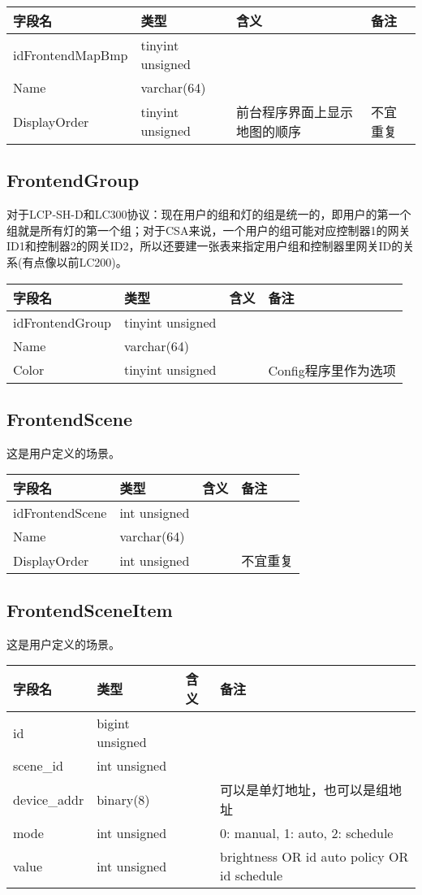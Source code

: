 \begin{longtabu}[c]{@{}lXXX@{}}
\toprule
字段名 & 类型 & 含义 & 备注\tabularnewline
\midrule
\endhead
idFrontendMapBmp & tinyint unsigned & &\tabularnewline
Name & varchar(64) & &\tabularnewline
DisplayOrder & tinyint unsigned & 前台程序界面上显示地图的顺序 &
不宜重复\tabularnewline
\bottomrule
\end{longtabu}

\subsection{FrontendGroup}\label{frontendgroup}

对于LCP-SH-D和LC300协议：现在用户的组和灯的组是统一的，即用户的第一个组就是所有灯的第一个组；对于CSA来说，一个用户的组可能对应控制器1的网关ID1和控制器2的网关ID2，所以还要建一张表来指定用户组和控制器里网关ID的关系(有点像以前LC200)。

\begin{longtabu}[c]{@{}lXXX@{}}
\toprule
字段名 & 类型 & 含义 & 备注\tabularnewline
\midrule
\endhead
idFrontendGroup & tinyint unsigned & &\tabularnewline
Name & varchar(64) & &\tabularnewline
Color & tinyint unsigned & & Config程序里作为选项\tabularnewline
\bottomrule
\end{longtabu}

\subsection{FrontendScene}\label{frontendscene}

这是用户定义的场景。

\begin{longtabu}[c]{@{}lXXX@{}}
\toprule
字段名 & 类型 & 含义 & 备注\tabularnewline
\midrule
\endhead
idFrontendScene & int unsigned & &\tabularnewline
Name & varchar(64) & &\tabularnewline
DisplayOrder & int unsigned & & 不宜重复\tabularnewline
\bottomrule
\end{longtabu}

\subsection{FrontendSceneItem}\label{frontendsceneitem}

这是用户定义的场景。

\begin{longtabu}[c]{@{}lXXX@{}}
\toprule
字段名 & 类型 & 含义 & 备注\tabularnewline
\midrule
\endhead
id & bigint unsigned & &\tabularnewline
scene\_id & int unsigned & &\tabularnewline
device\_addr & binary(8) & &
可以是单灯地址，也可以是组地址\tabularnewline
mode & int unsigned & & 0: manual, 1: auto, 2: schedule\tabularnewline
value & int unsigned & & brightness OR id auto policy OR id
schedule\tabularnewline
\bottomrule
\end{longtabu}

